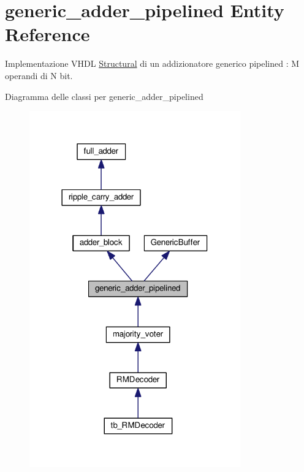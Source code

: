 \hypertarget{classgeneric__adder__pipelined}{\section{generic\+\_\+adder\+\_\+pipelined Entity Reference}
\label{classgeneric__adder__pipelined}
}


Implementazione V\+H\+D\+L \hyperlink{classgeneric__adder__pipelined_1_1_structural}{Structural} di un addizionatore generico pipelined \+: M operandi di N bit.  




Diagramma delle classi per generic\+\_\+adder\+\_\+pipelined\nopagebreak
\begin{figure}[H]
\begin{center}
\leavevmode
\includegraphics[width=258pt]{classgeneric__adder__pipelined__inherit__graph}
\end{center}
\end{figure}


